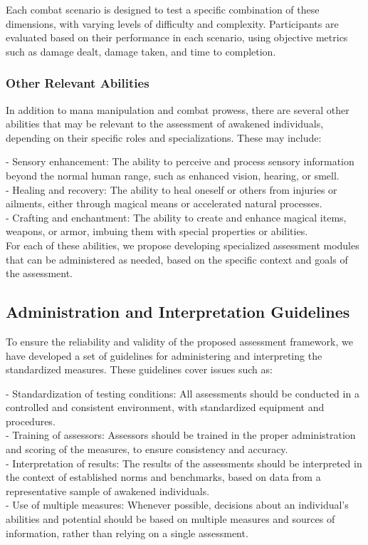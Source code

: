 \documentclass[12pt, a4paper]{article}
\begin{document}
Each combat scenario is designed to test a specific combination of these dimensions, with varying levels of difficulty and complexity. Participants are evaluated based on their performance in each scenario, using objective metrics such as damage dealt, damage taken, and time to completion.

\subsubsection{Other Relevant Abilities}

In addition to mana manipulation and combat prowess, there are several other abilities that may be relevant to the assessment of awakened individuals, depending on their specific roles and specializations. These may include:

- Sensory enhancement: The ability to perceive and process sensory information beyond the normal human range, such as enhanced vision, hearing, or smell.\\
- Healing and recovery: The ability to heal oneself or others from injuries or ailments, either through magical means or accelerated natural processes.\\
- Crafting and enchantment: The ability to create and enhance magical items, weapons, or armor, imbuing them with special properties or abilities.\\

For each of these abilities, we propose developing specialized assessment modules that can be administered as needed, based on the specific context and goals of the assessment.

\subsection{Administration and Interpretation Guidelines}

To ensure the reliability and validity of the proposed assessment framework, we have developed a set of guidelines for administering and interpreting the standardized measures. These guidelines cover issues such as:

- Standardization of testing conditions: All assessments should be conducted in a controlled and consistent environment, with standardized equipment and procedures.\\
- Training of assessors: Assessors should be trained in the proper administration and scoring of the measures, to ensure consistency and accuracy.\\
- Interpretation of results: The results of the assessments should be interpreted in the context of established norms and benchmarks, based on data from a representative sample of awakened individuals.\\
- Use of multiple measures: Whenever possible, decisions about an individual's abilities and potential should be based on multiple measures and sources of information, rather than relying on a single assessment.\\
\end{document}

